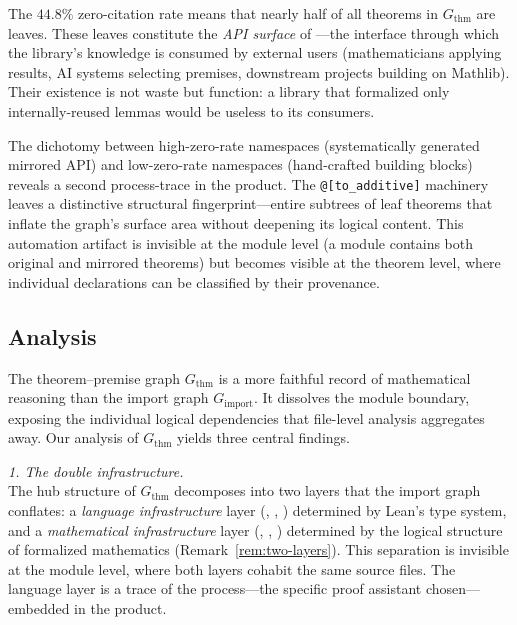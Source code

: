 \begin{remark}
\label{rem:leaf-theorems}
The $44.8\%$ zero-citation rate means that nearly half of all theorems in $G_{\mathrm{thm}}$ are leaves. These leaves constitute the \emph{API surface} of ---the interface through which the library's knowledge is consumed by external users (mathematicians applying results, AI systems selecting premises, downstream projects building on Mathlib). Their existence is not waste but function: a library that formalized only internally-reused lemmas would be useless to its consumers.

The dichotomy between high-zero-rate namespaces (systematically generated mirrored API) and low-zero-rate namespaces (hand-crafted building blocks) reveals a second process-trace in the product. The \texttt{@[to\_additive]} machinery leaves a distinctive structural fingerprint---entire subtrees of leaf theorems that inflate the graph's surface area without deepening its logical content. This automation artifact is invisible at the module level (a module contains both original and mirrored theorems) but becomes visible at the theorem level, where individual declarations can be classified by their provenance.
\end{remark}

\subsection{Analysis}
\label{sec:thm-conclusion}

The theorem--premise graph $G_{\mathrm{thm}}$ is a more faithful record of mathematical reasoning than the import graph $G_{\mathrm{import}}$. It dissolves the module boundary, exposing the individual logical dependencies that file-level analysis aggregates away. Our analysis of $G_{\mathrm{thm}}$ yields three central findings.

\medskip
\noindent\textit{1. The double infrastructure.}\\
The hub structure of $G_{\mathrm{thm}}$ decomposes into two layers that the import graph conflates: a \emph{language infrastructure} layer (, , ) determined by Lean's type system, and a \emph{mathematical infrastructure} layer (, , ) determined by the logical structure of formalized mathematics (Remark~\ref{rem:two-layers}). This separation is invisible at the module level, where both layers cohabit the same source files. The language layer is a trace of the process---the specific proof assistant chosen---embedded in the product.

